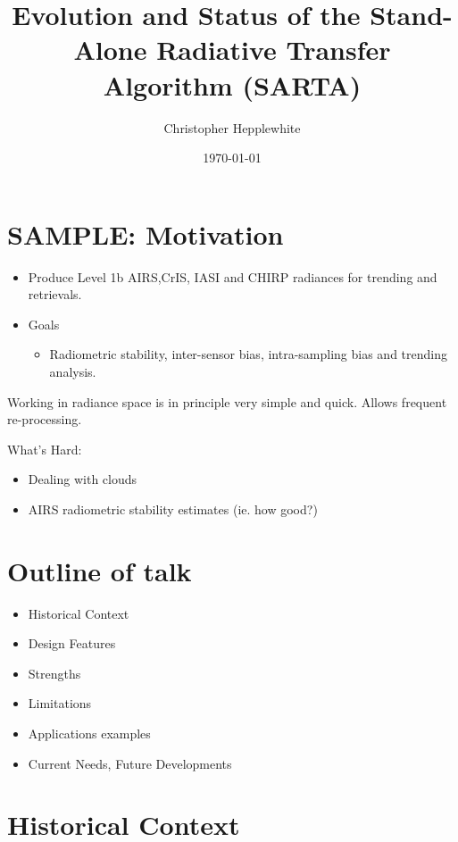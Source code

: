 \documentclass[10pt,t]{article}
\author{Christopher Hepplewhite}
\date{\today}
\title{\large Evolution and Status of the Stand-Alone Radiative Transfer Algorithm (SARTA)}
\begin{document}
\maketitle

\section{SAMPLE: Motivation}
\label{sec:orgd932b0f}
\begin{itemize}
\item Produce Level 1b AIRS,CrIS, IASI and CHIRP radiances for trending and retrievals.
\item Goals
\begin{itemize}
\item Radiometric stability, inter-sensor bias, intra-sampling bias and trending analysis.
\end{itemize}
\end{itemize}
\vspace{0.05in}

Working in radiance space is in principle very simple and quick.  Allows frequent re-processing. 

\vspace{0.05in}

What's Hard: 
\begin{itemize}
\item Dealing with clouds
\item AIRS radiometric stability estimates (ie. how good?)
\end{itemize}

\section{Outline of talk}
\label{sec:org9de1cb5}
\begin{itemize}
\item Historical Context
\item Design Features
\item Strengths
\item Limitations
\item Applications examples
\item Current Needs, Future Developments
\end{itemize}

\section{Historical Context}
\label{sec:org6c3d854}
\end{document}
